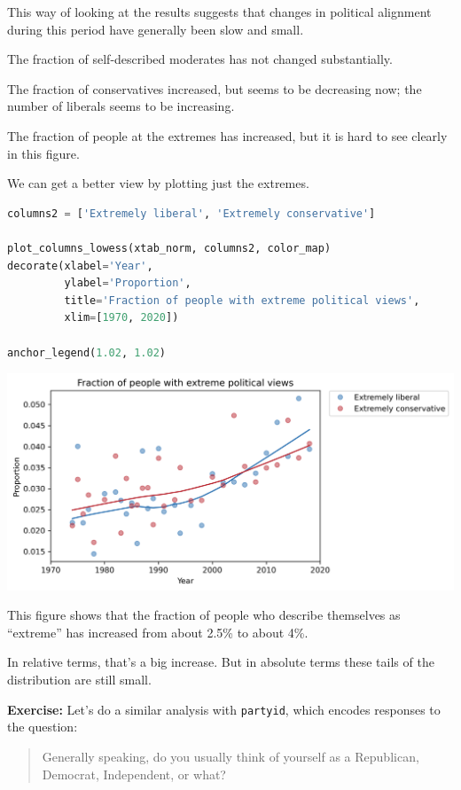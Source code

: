 This way of looking at the results suggests that changes in political
alignment during this period have generally been slow and small.

The fraction of self-described moderates has not changed substantially.

The fraction of conservatives increased, but seems to be decreasing now;
the number of liberals seems to be increasing.

The fraction of people at the extremes has increased, but it is hard to
see clearly in this figure.

We can get a better view by plotting just the extremes.

\begin{lstlisting}[language=Python,style=source]
columns2 = ['Extremely liberal', 'Extremely conservative']

plot_columns_lowess(xtab_norm, columns2, color_map)
decorate(xlabel='Year',
         ylabel='Proportion',
         title='Fraction of people with extreme political views',
         xlim=[1970, 2020])

anchor_legend(1.02, 1.02)
\end{lstlisting}

\begin{center}
\includegraphics[scale=0.75]{02_polviews_files/02_polviews_89_0.png}
\end{center}

This figure shows that the fraction of people who describe themselves as
``extreme'' has increased from about 2.5\% to about 4\%.

In relative terms, that's a big increase. But in absolute terms these
tails of the distribution are still small.

\textbf{Exercise:} Let's do a similar analysis with
\passthrough{\lstinline!partyid!}, which encodes responses to the
question:

\begin{quote}
Generally speaking, do you usually think of yourself as a Republican,
Democrat, Independent, or what?
\end{quote}

